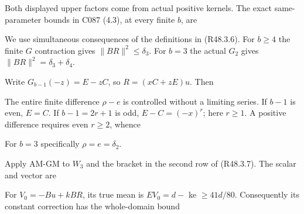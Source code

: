 
Both displayed upper factors come from actual positive kernels. The exact same-parameter bounds in C087 (4.3), at every finite \(b\), are


We use simultaneous consequences of the definitions in (R48.3.6). For \(b\ge 4\) the finite \(G\) contraction gives \(\lVert BR\rVert ^2\le \delta_3\). For \(b=3\) the actual \(G_{2}\) gives \(\lVert BR\rVert ^2=\delta_3+\delta_4\).

Write \(G_{b-1}(-z)=E-zC\), so \(R=(xC+zE)u\). Then


The entire finite difference \(\rho-e\) is controlled without a limiting series. If \(b-1\) is even, \(E=C\). If \(b-1=2r+1\) is odd, \(E-C=(-x)^r\); here \(r\ge 1\). A positive difference requires even \(r\ge 2\), whence


For \(b=3\) specifically \(\rho=e=\delta_2\).

Apply AM-GM to \(W_{3}\) and the bracket in the second row of (R48.3.7). The scalar and vector are


For \(V_0=-Bu+kBR\), its true mean is \(EV_{0}=d-\) ke \(\ge 41d/80\). Consequently its constant correction has the whole-domain bound


